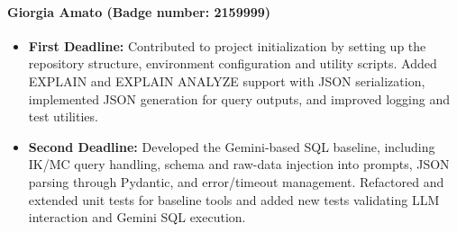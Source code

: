 \paragraph{\textbf{Giorgia Amato (Badge number: 2159999)}}
\begin{itemize}[leftmargin=*]
    \item \textbf{First Deadline:} Contributed to project initialization by setting up the repository structure, environment configuration and utility scripts. 
    Added EXPLAIN and EXPLAIN ANALYZE support with JSON serialization, implemented JSON generation for query outputs, and improved logging and test utilities.
     \item \textbf{Second Deadline:} Developed the Gemini-based SQL baseline, including IK/MC query handling, schema and raw-data injection into prompts, JSON parsing through Pydantic, and error/timeout management. 
     Refactored and extended unit tests for baseline tools and added new tests validating LLM interaction and Gemini SQL execution.
\end{itemize}